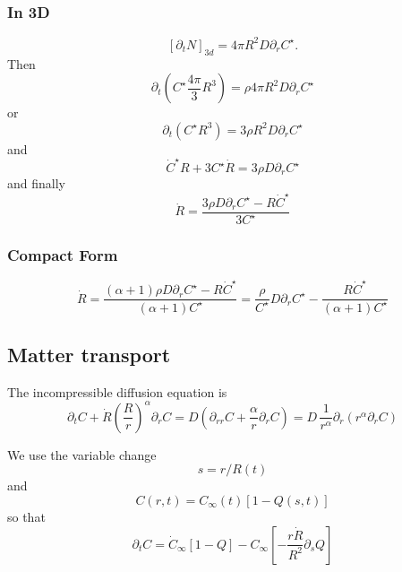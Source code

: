 \documentclass[11pt]{revtex4}
\begin{document}
\subsubsection{In 3D}
\begin{equation}
	\left[\partial_t N\right]_{3d} =  4\pi R^2 D \partial_r C^\star.
\end{equation}
Then
\begin{equation}
	\partial_t\left( C^\star \dfrac{4\pi}{3} R^3 \right) = \rho   4\pi R^2 D \partial_r C^\star
\end{equation}
or
\begin{equation}
	\partial_t\left( C^\star R^3\right) = 3\rho R^2 D \partial_r C^\star
\end{equation}
and
\begin{equation}
	\dot{C}^\star R + 3 C^\star \dot{R}  = 3\rho  D \partial_r C^\star
\end{equation}
and finally
\begin{equation}
	\dot{R} = \dfrac{3\rho  D \partial_r C^\star - R\dot{C}^\star}{3C^\star}
\end{equation}

\subsubsection{Compact Form}
\begin{equation}
	\dot{R} = \dfrac{(\alpha+1)\rho  D \partial_r C^\star - R\dot{C}^\star}{(\alpha+1)C^\star} = \dfrac{\rho}{C^\star} D\partial_rC^\star - \dfrac{R\dot{C}^\star}{\left(\alpha+1\right)C^\star}
\end{equation}

\subsection{Matter transport}
The incompressible diffusion equation is
\begin{equation}
	\partial_t C + \dot{R} \left(\dfrac{R}{r}\right)^\alpha  \partial_r C = D \left( \partial_{rr} C + \dfrac{\alpha}{r} \partial_r C \right) = D \, \dfrac{1}{r^\alpha} \partial_r \left(r^\alpha\partial_r C\right)
\end{equation}

We use the variable change 
\begin{equation}
	s = r / R(t)
\end{equation}
and
\begin{equation}
	C(r,t) = C_\infty(t) \left[1-Q(s,t)\right]
\end{equation}
so that
\begin{equation}
	\partial_t C = \dot{C}_\infty \left[1-Q\right] - C_\infty \left[ -\dfrac{r\dot{R}}{R^2} \partial_s Q \right]
\end{equation}
\end{document}
